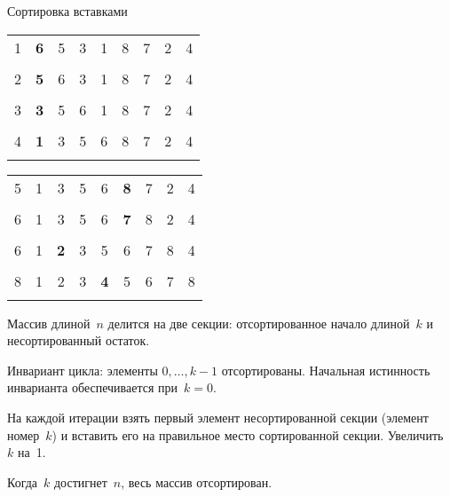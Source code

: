 \documentclass[landscape]{slides}
\begin{document}
\begin{slide}
  Сортировка вставками
  \begin{center}
    \renewcommand{\b}[1]{\textbf{#1}}
    \begin{tabular}{l|c|c|c|c|c|c|c|c|}
      \hhline{~|=|-------}
      1&	\b{6}&	5&	3&	1&      8&      7&      2&      4\\
      \hhline{~|=|-------}
      \multicolumn{9}{r}{}\\
      \hhline{~|==|------}
      2&	\b{5}&	6&	3&	1&      8&      7&      2&      4\\
      \hhline{~|==|------}
      \multicolumn{9}{r}{}\\
      \hhline{~|===|-----}
      3&	\b{3}&	5&	6&	1&      8&      7&      2&      4\\
      \hhline{~|===|-----}
      \multicolumn{9}{r}{}\\
      \hhline{~|====|----}
      4&	\b{1}&  3&	5&	6&	8&      7&      2&      4\\
      \hhline{~|====|----}
    \end{tabular}
    \qquad
    \begin{tabular}{l|c|c|c|c|c|c|c|c|}
      \hhline{~|=====|---}
        5&	1&	3&	5&	6&	\b{8}&	7&	2&	4\\
      \hhline{~|=====|---}
      \multicolumn{9}{r}{}\\
      \hhline{~|======|--}
        6&	1&	3&	5&	6&	\b{7}&	8&	2&	4\\
      \hhline{~|======|--}
      \multicolumn{9}{r}{}\\
      \hhline{~|=======|-}
      6&	1&	\b{2}&	3&	5&	6&	7&	8&	4\\
      \hhline{~|=======|-}
      \multicolumn{9}{r}{}\\
      \hhline{~|========|}
      8&	1&	2&	3&	\b{4}&	5&	6&	7&	8\\
      \hhline{~|========|}
    \end{tabular}
  \end{center}
  Массив длиной~$n$ делится на две секции: отсортированное начало длиной~$k$ и несортированный остаток.

  Инвариант цикла: элементы $0,\ldots,k-1$ отсортированы. Начальная истинность инварианта обеспечивается при~$k=0$.

  На каждой итерации взять первый элемент несортированной секции (элемент номер~$k$) и вставить его на правильное место
  сортированной секции. Увеличить~$k$ на~1.

  Когда~$k$ достигнет~$n$, весь массив отсортирован.
\end{slide}
\end{document}
